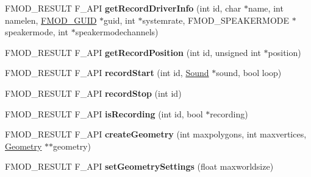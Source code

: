\begin{DoxyCompactItemize}
\item 
\hypertarget{class_f_m_o_d_1_1_system_a875f5264472ab6711c20984198f4e220}{F\+M\+O\+D\+\_\+\+R\+E\+S\+U\+L\+T F\+\_\+\+A\+P\+I {\bfseries get\+Record\+Driver\+Info} (int id, char $\ast$name, int namelen, \hyperlink{struct_f_m_o_d___g_u_i_d}{F\+M\+O\+D\+\_\+\+G\+U\+I\+D} $\ast$guid, int $\ast$systemrate, F\+M\+O\+D\+\_\+\+S\+P\+E\+A\+K\+E\+R\+M\+O\+D\+E $\ast$speakermode, int $\ast$speakermodechannels)}\label{class_f_m_o_d_1_1_system_a875f5264472ab6711c20984198f4e220}

\item 
\hypertarget{class_f_m_o_d_1_1_system_a508b2368e0c8d9d7d582b89e957c5b5b}{F\+M\+O\+D\+\_\+\+R\+E\+S\+U\+L\+T F\+\_\+\+A\+P\+I {\bfseries get\+Record\+Position} (int id, unsigned int $\ast$position)}\label{class_f_m_o_d_1_1_system_a508b2368e0c8d9d7d582b89e957c5b5b}

\item 
\hypertarget{class_f_m_o_d_1_1_system_a244b4cd7c917fa73354a0b1579003e15}{F\+M\+O\+D\+\_\+\+R\+E\+S\+U\+L\+T F\+\_\+\+A\+P\+I {\bfseries record\+Start} (int id, \hyperlink{class_f_m_o_d_1_1_sound}{Sound} $\ast$sound, bool loop)}\label{class_f_m_o_d_1_1_system_a244b4cd7c917fa73354a0b1579003e15}

\item 
\hypertarget{class_f_m_o_d_1_1_system_a8fb57bf64f8e40ea7e0183cec6765c0f}{F\+M\+O\+D\+\_\+\+R\+E\+S\+U\+L\+T F\+\_\+\+A\+P\+I {\bfseries record\+Stop} (int id)}\label{class_f_m_o_d_1_1_system_a8fb57bf64f8e40ea7e0183cec6765c0f}

\item 
\hypertarget{class_f_m_o_d_1_1_system_a30d96283b97941279b8896a5993c6592}{F\+M\+O\+D\+\_\+\+R\+E\+S\+U\+L\+T F\+\_\+\+A\+P\+I {\bfseries is\+Recording} (int id, bool $\ast$recording)}\label{class_f_m_o_d_1_1_system_a30d96283b97941279b8896a5993c6592}

\item 
\hypertarget{class_f_m_o_d_1_1_system_a3652e6e628a0b634f3670d40fde05938}{F\+M\+O\+D\+\_\+\+R\+E\+S\+U\+L\+T F\+\_\+\+A\+P\+I {\bfseries create\+Geometry} (int maxpolygons, int maxvertices, \hyperlink{class_f_m_o_d_1_1_geometry}{Geometry} $\ast$$\ast$geometry)}\label{class_f_m_o_d_1_1_system_a3652e6e628a0b634f3670d40fde05938}

\item 
\hypertarget{class_f_m_o_d_1_1_system_a421603edcdc170de9d72d8ab95ee0fbd}{F\+M\+O\+D\+\_\+\+R\+E\+S\+U\+L\+T F\+\_\+\+A\+P\+I {\bfseries set\+Geometry\+Settings} (float maxworldsize)}\label{class_f_m_o_d_1_1_system_a421603edcdc170de9d72d8ab95ee0fbd}


\end{DoxyCompactItemize}
